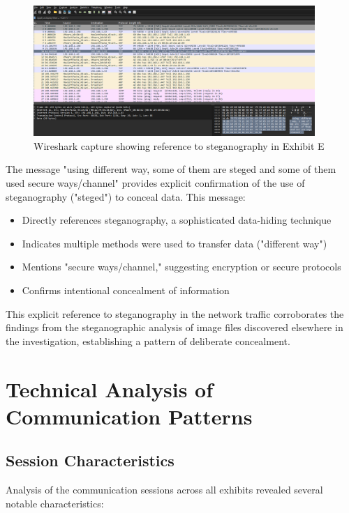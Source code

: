 \begin{figure}[h]
    \centering
    \includegraphics[width=0.95\textwidth]{images/Network_Analysis/ExhibitE_pcap_steg.png}
    \caption{Wireshark capture showing reference to steganography in Exhibit E}
    \label{fig:exhibit_e_steg}
\end{figure}

The message "using different way, some of them are steged and some of them used secure ways/channel" provides explicit confirmation of the use of steganography ("steged") to conceal data. This message:

\begin{itemize}
    \item Directly references steganography, a sophisticated data-hiding technique
    \item Indicates multiple methods were used to transfer data ("different way")
    \item Mentions "secure ways/channel," suggesting encryption or secure protocols
    \item Confirms intentional concealment of information
\end{itemize}

This explicit reference to steganography in the network traffic corroborates the findings from the steganographic analysis of image files discovered elsewhere in the investigation, establishing a pattern of deliberate concealment.

\section{Technical Analysis of Communication Patterns}

\subsection{Session Characteristics}
Analysis of the communication sessions across all exhibits revealed several notable characteristics:

